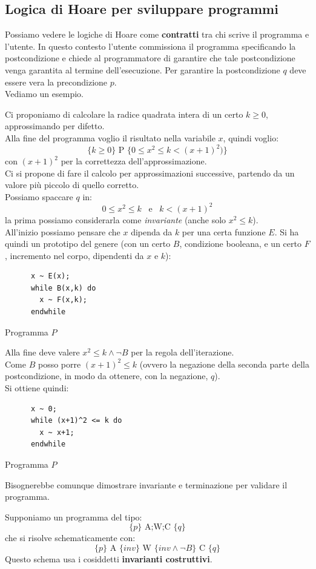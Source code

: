 \documentclass[a4paper,12pt, oneside]{book}
\begin{document}
\subsection{Logica di Hoare per sviluppare programmi}
Possiamo vedere le logiche di Hoare come \textbf{contratti} tra chi scrive il
programma e l'utente. In questo contesto l'utente commissiona il programma
specificando la postcondizione e chiede al programmatore di garantire che tale
postcondizione venga garantita al termine dell'esecuzione. Per garantire la
postcondizione $q$ deve essere vera la precondizione $p$.\\
Vediamo un esempio.
\begin{esempio}
  Ci proponiamo di calcolare la radice quadrata intera di un certo $k\geq 0$,
  approssimando per difetto.\\
  Alla fine del programma voglio il risultato nella variabile $x$, quindi
  voglio:
  \[\{k\geq 0\}\mbox{ P }\{0\leq x^2\leq k<(x+1)^2)\}\]
  con $(x+1)^2$ per la correttezza dell'approssimazione.\\
  Ci si propone di fare il calcolo per approssimazioni successive, partendo da
  un valore più piccolo di quello corretto.\\
  Possiamo spaccare $q$ in:
  \[0\leq x^2\leq k \,\,\,\mbox{ e }\,\,\,k<(x+1)^2\]
  la prima possiamo considerarla come \textit{invariante} (anche solo $x^2\leq
  k$).\\
  
  All'inizio possiamo pensare che $x$ dipenda da $k$ per una certa funzione $E$.
  Si ha quindi un prototipo del genere (con un certo $B$, condizione booleana, e
  un certo $F$, incremento nel corpo, dipendenti da $x$ e $k$):
  \begin{listing}[H]
    \begin{lstlisting}
      x ~ E(x);
      while B(x,k) do
        x ~ F(x,k);
      endwhile  
    \end{lstlisting}
    \caption{Programma $P$}
  \end{listing}
  Alla fine deve valere $x^2\leq k \land \neg B$ per la regola
  dell'iterazione.\\
  Come $B$ posso porre $(x+1)^2\leq k$ (ovvero la negazione della seconda parte
  della postcondizione, in modo da ottenere, con la negazione, $q$).\\ Si
  ottiene quindi: 
  \begin{listing}[H]
    \begin{lstlisting}
      x ~ 0;
      while (x+1)^2 <= k do
        x ~ x+1;
      endwhile  
    \end{lstlisting}
    \caption{Programma $P$}
  \end{listing}
  Bisognerebbe comunque dimostrare invariante e terminazione per validare il
  programma. 
\end{esempio}
Supponiamo un programma del tipo:
\[\{p\}\mbox{ A;W;C } \{q\}\]
che si risolve schematicamente con:
\[\{p\}\mbox{ A } \{inv\} \mbox{ W } \{inv\land \neg B\}\mbox{ C }\{q\}\]
Questo schema usa i cosiddetti \textbf{invarianti costruttivi}.\\
\end{document}
